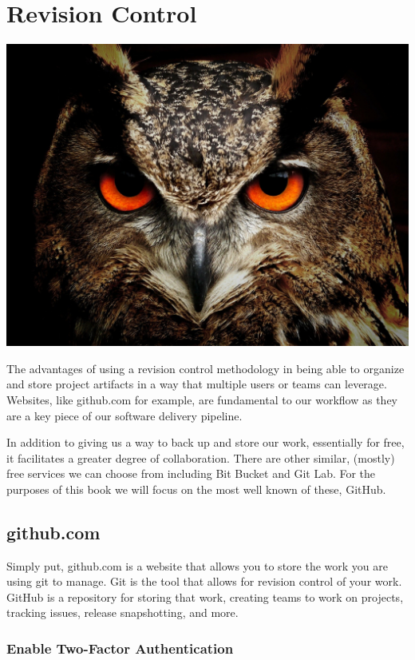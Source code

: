 \chapter{Revision Control}

\includegraphics[scale=0.20]{../images/owl-50267_1920.jpg}

\justify
The advantages of using a revision control methodology in being able to
organize and store project artifacts in a way that multiple users or
teams can leverage. Websites, like github.com for example, are
fundamental to our workflow as they are a key piece of our software
delivery pipeline.

\justify
In addition to giving us a way to back up and store our work,
essentially for free, it facilitates a greater degree of collaboration.
There are other similar, (mostly) free services we can choose from
including Bit Bucket and Git Lab. For the purposes of this book we will
focus on the most well known of these, GitHub.

\section{github.com}

Simply put, github.com is a website that allows you to store the work
you are using git to manage. Git is the tool that allows for revision
control of your work. GitHub is a repository for storing that work,
creating teams to work on projects, tracking issues, release
snapshotting, and more.

\subsection{Enable Two-Factor Authentication}

